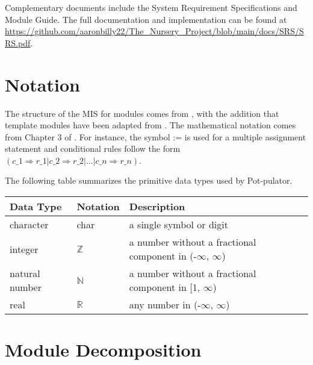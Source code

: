 \documentclass[12pt, titlepage]{article}
\begin{document}
\noindent Complementary documents include the System Requirement Specifications
and Module Guide.  The full documentation and implementation can be
found at \url{https://github.com/aaronbilly22/The\_Nursery\_Project/blob/main/docs/SRS/SRS.pdf}. 

\section{Notation}


The structure of the MIS for modules comes from \citet{HoffmanAndStrooper1995},
with the addition that template modules have been adapted from
\cite{GhezziEtAl2003}.  The mathematical notation comes from Chapter 3 of
\citet{HoffmanAndStrooper1995}.  For instance, the symbol := is used for a
multiple assignment statement and conditional rules follow the form $(c\_1
\Rightarrow r\_1 | c\_2 \Rightarrow r\_2 | ... | c\_n \Rightarrow r\_n )$.

The following table summarizes the primitive data types used by Pot-pulator. 

\begin{center}
\renewcommand{\arraystretch}{1.2}
\noindent 
\begin{tabular}{l l p{7.5cm}} 
\toprule 
\textbf{Data Type} & \textbf{Notation} & \textbf{Description}\\ 
\midrule
character & char & a single symbol or digit\\
integer & $\mathbb{Z}$ & a number without a fractional component in (-$\infty$, $\infty$) \\
natural number & $\mathbb{N}$ & a number without a fractional component in [1, $\infty$) \\
real & $\mathbb{R}$ & any number in (-$\infty$, $\infty$)\\
\bottomrule
\end{tabular} 
\end{center}

\noindent

\section{Module Decomposition}
\end{document}
